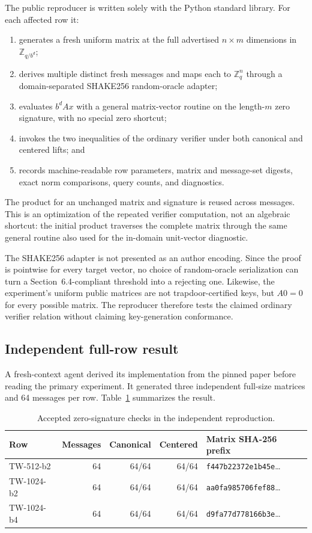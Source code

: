 \documentclass[10pt,a4paper]{article}
\newcommand{\Z}{\mathbb{Z}}
\begin{document}
The public reproducer is written solely with the Python standard library. For
each affected row it:
\begin{enumerate}
  \item generates a fresh uniform matrix at the full advertised
        $n\times m$ dimensions in $\Z_{q/b^d}$;
  \item derives multiple distinct fresh messages and maps each to
        $\Z_q^n$ through a domain-separated SHAKE256 random-oracle adapter;
  \item evaluates $b^dAx$ with a general matrix-vector routine on the
        length-$m$ zero signature, with no special zero shortcut;
  \item invokes the two inequalities of the ordinary verifier under both
        canonical and centered lifts; and
  \item records machine-readable row parameters, matrix and message-set
        digests, exact norm comparisons, query counts, and diagnostics.
\end{enumerate}
The product for an unchanged matrix and signature is reused across messages.
This is an optimization of the repeated verifier computation, not an
algebraic shortcut: the initial product traverses the complete matrix through
the same general routine also used for the in-domain unit-vector diagnostic.

The SHAKE256 adapter is not presented as an author encoding. Since the proof
is pointwise for every target vector, no choice of random-oracle serialization
can turn a Section~6.4-compliant threshold into a rejecting one. Likewise,
the experiment's uniform public matrices are not trapdoor-certified keys, but
$A0=0$ for every possible matrix. The reproducer therefore tests the claimed
ordinary verifier relation without claiming key-generation conformance.

\subsection{Independent full-row result}

A fresh-context agent derived its implementation from the pinned paper before
reading the primary experiment. It generated three independent full-size
matrices and 64 messages per row. Table~\ref{tab:results} summarizes the
result.

\begin{table}[ht]
\centering
\small
\begin{tabular}{@{}lrrrl@{}}
\toprule
Row & Messages & Canonical & Centered & Matrix SHA-256 prefix\\
\midrule
TW-512-b2  & 64 & 64/64 & 64/64 & \texttt{f447b22372e1b45e}\ldots\\
TW-1024-b2 & 64 & 64/64 & 64/64 & \texttt{aa0fa985706fef88}\ldots\\
TW-1024-b4 & 64 & 64/64 & 64/64 & \texttt{d9fa77d778166b3e}\ldots\\
\bottomrule
\end{tabular}
\caption{Accepted zero-signature checks in the independent reproduction.}
\label{tab:results}
\end{table}
\end{document}
